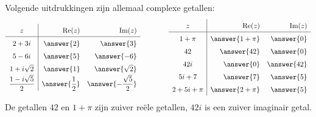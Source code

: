 \documentclass{ximera}
\begin{document}
\begin{example} Volgende uitdrukkingen zijn allemaal complexe getallen:
$$
\def\arraystretch{1.5}
\begin{array}{c|rr c lll}
    z & \Re(z) & \Im(z) \\\hline
    2+3i & \answer{2} & \answer{3} 
    \\
    5-6i &\answer{5} & \answer{-6} 
    \\
    1+i\sqrt{2} & \answer{1} & \answer{\sqrt{2}}
    \\
    \dfrac{1-i\sqrt{5}}{2}  & \answer{\dfrac{1}{2}} & \answer{-\dfrac{\sqrt{5}}{2}}
    \\
\end{array}
\qquad\qquad
\begin{array}{c|rr c lll}
    z & \Re(z) & \Im(z) \\\hline
    1+\pi & \answer{1+\pi} & \answer{0}
    \\
    42 & \answer{42} & \answer{0}
    \\
    42i & \answer{0} & \answer{42} 
    \\
    5i + 7 & \answer{7} & \answer{5} 
    \\
    2+ 5i + \pi & \answer{2+\pi} & \answer{5} 
    \\
\end{array}
$$
De getallen $42$ en $1+\pi$ zijn zuiver reële getallen, $42i$ is een zuiver imaginair getal. 
\\
\end{example}
\end{document}
